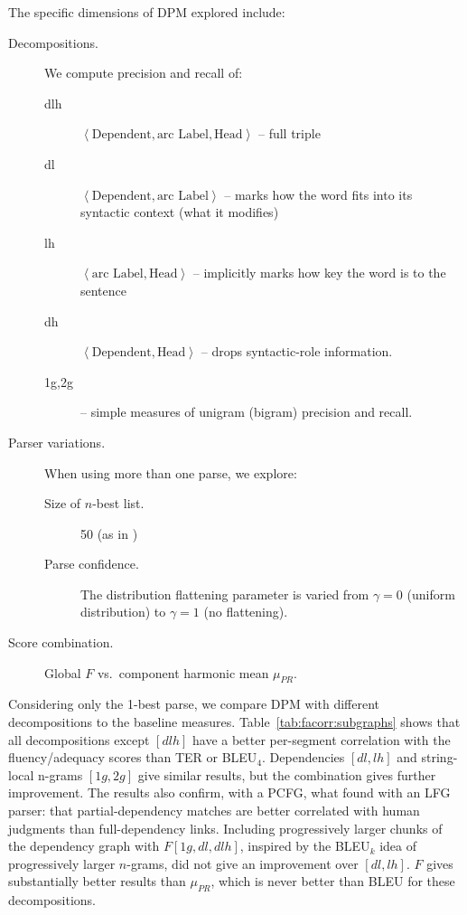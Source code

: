 \documentclass{kluwer}    %
\begin{document}
\begin{article}
The specific dimensions of DPM explored include:
\begin{description}
\item[Decompositions.] We compute precision and recall of:
  \begin{description}
  \item[dlh] $\left\langle \textrm{Dependent}, \textrm{arc Label},
      \textrm{Head}\right\rangle$ -- full triple
  \item[dl] $\left\langle \textrm{Dependent}, \textrm{arc Label}
      \right\rangle$ --  marks how the word
      fits into its syntactic context (what it modifies)
    \item[lh] $\left\langle \textrm{arc Label}, \textrm{Head}
      \right\rangle$ --  implicitly marks how
      key the word is to the sentence
    \item[dh] $\left\langle \textrm{Dependent}, \textrm{Head}
      \right\rangle$ -- drops syntactic-role information.
    \item[1g,2g] -- simple measures of unigram
      (bigram) precision and recall.
  \end{description}
\item[Parser variations.] When using more than one parse, we explore:
  \begin{description}
  \item[Size of $n$-best list.] 50 (as in \cite{owczarzak07evaluatingmt})
  \item[Parse confidence.] The distribution flattening
    parameter is varied from $\gamma=0$ (uniform distribution) to $\gamma=1$
    (no flattening).
  \end{description}
\item[Score combination.] Global $F$ vs.\ component harmonic mean $\mu_{PR}$.
\end{description}


Considering only the 1-best parse, we compare DPM with different
decompositions to the baseline measures.
Table~\ref{tab:facorr:subgraphs} shows that all decompositions except
$[dlh]$ have a better per-segment correlation with the
fluency/adequacy scores than TER or BLEU$_4$. Dependencies $[dl,lh]$
and string-local n-grams $[1g,2g]$ give similar results, but the
combination gives further improvement.  The results also confirm, with
a PCFG, what  found with an LFG
parser: that partial-dependency matches are better correlated with
human judgments than full-dependency links. Including progressively
larger chunks of the dependency graph with $F[1g,dl,dlh]$, inspired by
the BLEU$_k$ idea of progressively larger $n$-grams, did not give an
improvement over $[dl,lh]$.  $F$ gives substantially better results than
$\mu_{PR}$, which is never better than BLEU for these decompositions.


\end{article}
\end{document}
